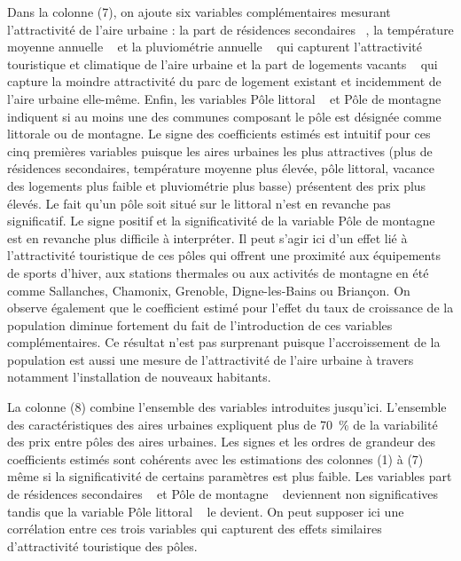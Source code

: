 \documentclass[10.5pt,a4paper]{article}
\begin{document}
{Dans la colonne (7), on ajoute six variables complémentaires mesurant l'attractivité de l'aire urbaine : la \og part de résidences secondaires \fg~, la \og température moyenne annuelle \fg~ et la \og pluviométrie annuelle \fg~ qui capturent l'attractivité touristique et climatique de l'aire urbaine et la \og part de logements vacants \fg~ qui capture la moindre attractivité du parc de logement existant et incidemment de l'aire urbaine elle-même. Enfin, les variables \og Pôle littoral \fg~  et \og Pôle de montagne \fg~ indiquent si au moins une des communes composant le pôle est désignée comme littorale ou de montagne. Le signe des coefficients estimés est intuitif pour ces cinq premières variables puisque les aires urbaines les plus attractives (plus de résidences secondaires, température moyenne plus élevée, pôle littoral, vacance des logements plus faible et pluviométrie plus basse) présentent des prix plus élevés. Le fait qu'un pôle soit situé sur le littoral n'est en revanche pas significatif. Le signe positif et la significativité de la variable  \og Pôle de montagne \fg~ est en revanche plus difficile à interpréter. Il peut s'agir ici d'un effet lié à l'attractivité touristique de ces pôles qui offrent une proximité aux équipements de sports d'hiver, aux stations thermales ou aux activités de montagne en été comme Sallanches, Chamonix, Grenoble, Digne-les-Bains ou Briançon. On observe également que le coefficient estimé pour l'effet du taux de croissance de la population diminue fortement du fait de l'introduction de ces variables complémentaires. Ce résultat n'est pas surprenant puisque l'accroissement de la population est aussi une mesure de l'attractivité de l'aire urbaine à travers notamment l'installation de nouveaux habitants.\par   

La colonne (8) combine l'ensemble des variables introduites jusqu'ici. L'ensemble des caractéristiques des aires urbaines expliquent plus de 70~\% de la variabilité des prix entre pôles des aires urbaines.  Les signes et les ordres de grandeur des coefficients estimés sont cohérents avec les estimations des colonnes (1) à (7) même si la significativité de certains paramètres est plus faible. Les variables \og part de résidences secondaires \fg~  et \og Pôle de montagne \fg~ deviennent non significatives tandis que la variable \og Pôle littoral \fg~  le devient. On peut supposer ici une corrélation entre ces trois variables qui capturent des effets similaires d’attractivité touristique des pôles. \par  

}
\end{document}
